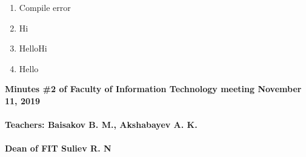 \documentclass[10pt]{article}
\begin{document}
\begin{enumerate}
\begin{lstlisting}[language=C++]
\end{lstlisting}
\begin{multicols}{4}
\begin{enumerate}
    \item Compile error
    \item Hi
    \item HelloHi
    \item Hello
\end{enumerate}
\end{multicols}






\end{enumerate}
\textbf{
Minutes \#2 of Faculty of Information Technology meeting November 11, 2019 \\\\
Teachers: Baisakov B. M., Akshabayev A. K. \\\\ 
Dean of FIT Suliev R. N \\\\
}
\end{document}
